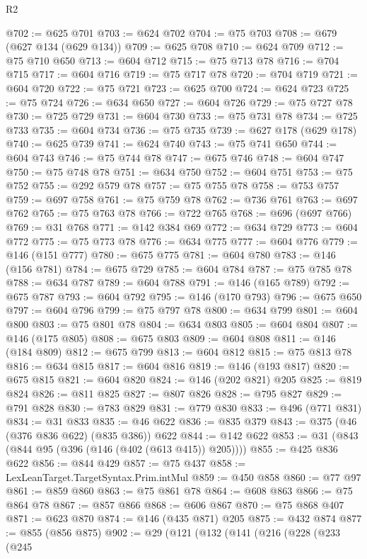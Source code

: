 \begin{lexlean}{R2}
\begin{coremodule}
{{{{{{{{{{{{{{{{{{{{{{{{{{{{{{{{{{{{{{{{{{{@702 := @625 @701
@703 := @624 @702
@704 := @75 @703
@708 := @679 (@627 @134 (@629 @134))
@709 := @625 @708
@710 := @624 @709
@712 := @75 @710 @650
@713 := @604 @712
@715 := @75 @713 @78
@716 := @704 @715
@717 := @604 @716
@719 := @75 @717 @78
@720 := @704 @719
@721 := @604 @720
@722 := @75 @721
@723 := @625 @700
@724 := @624 @723
@725 := @75 @724
@726 := @634 @650
@727 := @604 @726
@729 := @75 @727 @78
@730 := @725 @729
@731 := @604 @730
@733 := @75 @731 @78
@734 := @725 @733
@735 := @604 @734
@736 := @75 @735
@739 := @627 @178 (@629 @178)
@740 := @625 @739
@741 := @624 @740
@743 := @75 @741 @650
@744 := @604 @743
@746 := @75 @744 @78
@747 := @675 @746
@748 := @604 @747
@750 := @75 @748 @78
@751 := @634 @750
@752 := @604 @751
@753 := @75 @752
@755 := @292 @579 @78
@757 := @75 @755 @78
@758 := @753 @757
@759 := @697 @758
@761 := @75 @759 @78
@762 := @736 @761
@763 := @697 @762
@765 := @75 @763 @78
@766 := @722 @765
@768 := @696 (@697 @766)
@769 := @31 @768
@771 := @142 @384 @69
@772 := @634 @729
@773 := @604 @772
@775 := @75 @773 @78
@776 := @634 @775
@777 := @604 @776
@779 := @146 (@151 @777)
@780 := @675 @775
@781 := @604 @780
@783 := @146 (@156 @781)
@784 := @675 @729
@785 := @604 @784
@787 := @75 @785 @78
@788 := @634 @787
@789 := @604 @788
@791 := @146 (@165 @789)
@792 := @675 @787
@793 := @604 @792
@795 := @146 (@170 @793)
@796 := @675 @650
@797 := @604 @796
@799 := @75 @797 @78
@800 := @634 @799
@801 := @604 @800
@803 := @75 @801 @78
@804 := @634 @803
@805 := @604 @804
@807 := @146 (@175 @805)
@808 := @675 @803
@809 := @604 @808
@811 := @146 (@184 @809)
@812 := @675 @799
@813 := @604 @812
@815 := @75 @813 @78
@816 := @634 @815
@817 := @604 @816
@819 := @146 (@193 @817)
@820 := @675 @815
@821 := @604 @820
@824 := @146 (@202 @821) @205
@825 := @819 @824
@826 := @811 @825
@827 := @807 @826
@828 := @795 @827
@829 := @791 @828
@830 := @783 @829
@831 := @779 @830
@833 := @496 (@771 @831)
@834 := @31 @833
@835 := @46 @622
@836 := @835 @379
@843 := @375 (@46 (@376 @836 @622) (@835 @386)) @622
@844 := @142 @622
@853 := @31 (@843 (@844 @95 (@396 (@146 (@402 (@613 @415)) @205))))
@855 := @425 @836 @622
@856 := @844 @429
@857 := @75 @437
@858 := LexLeanTarget.TargetSyntax.Prim.intMul
@859 := @450 @858
@860 := @77 @97
@861 := @859 @860
@863 := @75 @861 @78
@864 := @608 @863
@866 := @75 @864 @78
@867 := @857 @866
@868 := @606 @867
@870 := @75 @868 @407
@871 := @623 @870
@874 := @146 (@435 @871) @205
@875 := @432 @874
@877 := @855 (@856 @875)
@902 := @29
    (@121
      (@132
        (@141
          (@216
            (@228
              (@233
                (@245
}}}}}}}}}}}}}}}}}}}}}}}}}}}}}}}}}}}}}}}}}}}
\end{coremodule}
\end{lexlean}
